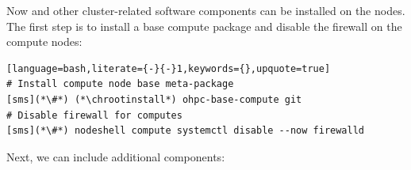 \noindent Now \OHPC{} and other cluster-related software components can be
installed on the nodes. The first step is to install a base compute package
and disable the firewall on the compute nodes:
\begin{lstlisting}[language=bash,literate={-}{-}1,keywords={},upquote=true]
# Install compute node base meta-package
[sms](*\#*) (*\chrootinstall*) ohpc-base-compute git
# Disable firewall for computes
[sms](*\#*) nodeshell compute systemctl disable --now firewalld
\end{lstlisting}

\noindent Next, we can include additional components:
